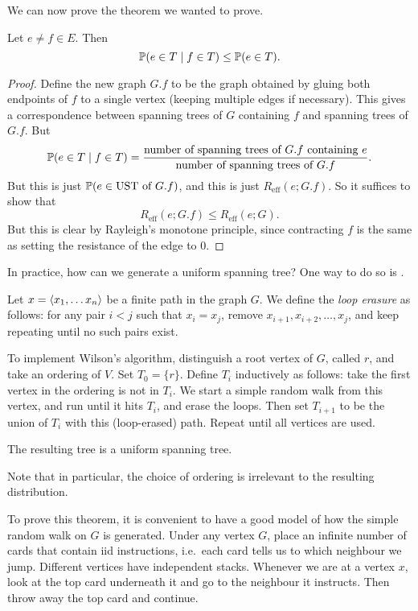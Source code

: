 \documentclass[a4paper]{article}
\begin{document}
We can now prove the theorem we wanted to prove.
\begin{thm}
  Let $e \not= f \in E$. Then
  \[
    \P(e \in T \mid f \in T) \leq \P(e \in T).
  \]
\end{thm}

\begin{proof}
  Define the new graph $G.f$ to be the graph obtained by gluing both endpoints of $f$ to a single vertex (keeping multiple edges if necessary). This gives a correspondence between spanning trees of $G$ containing $f$ and spanning trees of $G.f$. But
  \[
    \P(e \in T \mid f \in T) = \frac{\text{number of spanning trees of $G.f$ containing $e$}}{\text{number of spanning trees of $G.f$}}.
  \]
  But this is just $\P(e \in \text{UST of $G.f$})$, and this is just $R_{\mathrm{eff}}(e; G .f)$. So it suffices to show that
  \[
    R_{\mathrm{eff}}(e; G.f) \leq R_{\mathrm{eff}}(e; G).
  \]
  But this is clear by Rayleigh's monotone principle, since contracting $f$ is the same as setting the resistance of the edge to $0$.
\end{proof}

In practice, how can we generate a uniform spanning tree? One way to do so is .

\begin{defi}
  Let $x = \bra x_1, \ldots x_n\ket$ be a finite path in the graph $G$. We define the \emph{loop erasure} as follows: for any pair $i < j$ such that $x_i = x_j$, remove $x_{i + 1}, x_{i+2}, \ldots, x_j$, and keep repeating until no such pairs exist.
\end{defi}

To implement Wilson's algorithm, distinguish a root vertex of $G$, called $r$, and take an ordering of $V$. Set $T_0 = \{r\}$. Define $T_i$ inductively as follows: take the first vertex in the ordering is not in $T_i$. We start a simple random walk from this vertex, and run until it hits $T_i$, and erase the loops. Then set $T_{i + 1}$ to be the union of $T_i$ with this (loop-erased) path. Repeat until all vertices are used.

\begin{thm}[Wilson]
  The resulting tree is a uniform spanning tree.
\end{thm}
Note that in particular, the choice of ordering is irrelevant to the resulting distribution.

To prove this theorem, it is convenient to have a good model of how the simple random walk on $G$ is generated. Under any vertex $G$, place an infinite number of cards that contain iid instructions, i.e.\ each card tells us to which neighbour we jump. Different vertices have independent stacks. Whenever we are at a vertex $x$, look at the top card underneath it and go to the neighbour it instructs. Then throw away the top card and continue.
\end{document}
